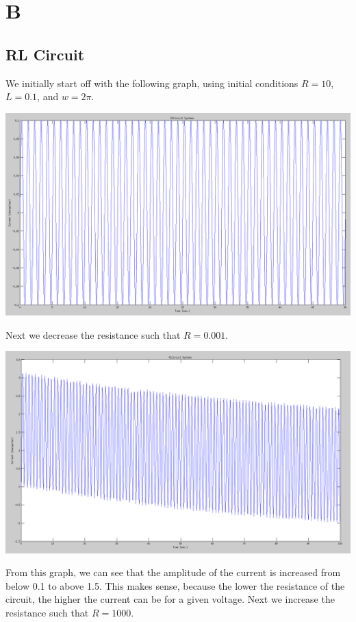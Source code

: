 \documentclass[titlepage,12pt]{article}
\begin{document}
\section*{B}

\subsection*{RL Circuit}
We initially start off with the following graph, using initial conditions
$R = 10$, $L = 0.1$, and $w = 2\pi$.
\begin{center}
  \includegraphics[scale=0.25]{r10l01w2pi.png}
\end{center}

\noindent Next we decrease the resistance such that $R = 0.001$.

\begin{center}
  \includegraphics[scale=0.25]{r0001l01w2pi.png}
\end{center}

\noindent From this graph, we can see that the amplitude of the current is increased from below 0.1 to above 1.5. This makes sense, because the lower the resistance of the circuit, the higher the current can be for a given voltage. Next we increase the resistance such that $R = 1000$.
\end{document}
